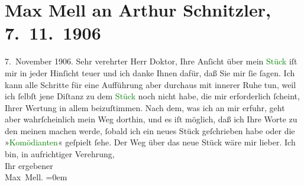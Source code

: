 

               \section[Max Mell an Arthur Schnitzler, 7. 11. 1906]{ Max Mell an Arthur Schnitzler, 7. 11. 1906}\nopagebreak{}\rehead{ }\normalsize\beginnumbering{} \toendnotes[C]{\smallbreak\pagebreak[2]} 
\toendnotes[C]{\smallbreak}\pstart
           \raggedleft{}{\pb}7. November 1906.\pend
           \pstart{}Sehr verehrter Herr Doktor,\pend\pstart
           Ihre Anſicht über mein \textcolor{green}{Stück}{}
                    iſt mir in jeder Hinſicht teuer und ich danke Ihnen dafür, daß Sie mir ſie
                    ſagen. Ich kann alle Schritte für eine Aufführung aber durchaus mit innerer Ruhe
                    tun, weil ich ſelbſt jene Diſtanz zu dem \textcolor{green}{Stück}{} noch nicht habe, die mir erforderlich ſcheint,
                    Ihrer Wertung in allem beizuſtimmen. Nach dem, was ich an mir erfuhr, geht aber
                    wahrſcheinlich mein Weg dorthin, und es iſt möglich, daß ich Ihre Worte zu den
                    meinen machen werde, ſobald ich ein neues Stück geſchrieben habe oder die »\textcolor{green}{Komödianten}{}\ledrightnote{\textcolor{green}{Die Komödianten}}« geſpielt ſehe. Der Weg über das
                    neue Stück wäre mir lieber.\pend
           \pstart
           Ich bin, in aufrichtiger Verehrung,{\\[\baselineskip]}Ihr ergebener{\\[\baselineskip]}\spacefill\mbox{Max Mell.}\pend
           \leftskip=0em{}\endnumbering{}  
      